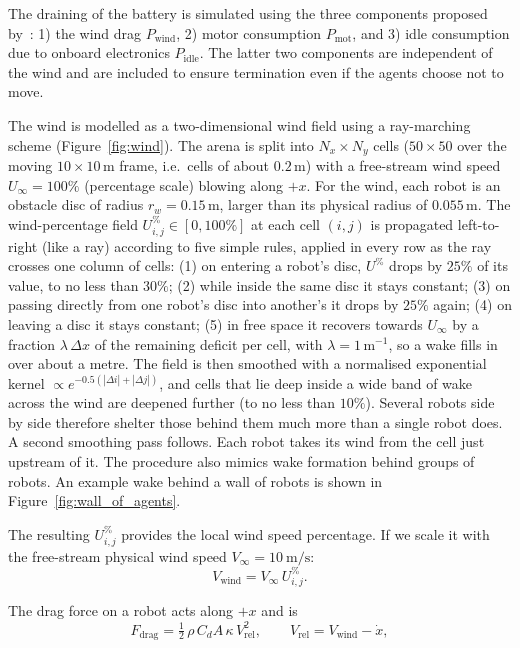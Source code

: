\documentclass[runningheads]{llncs}
\begin{document}
The draining of the battery is simulated using the three components proposed by~\cite{mahdavi2026energy}: 1) the wind drag $P_\text{wind}$, 2) motor consumption $P_\text{mot}$, and 3) idle consumption due to onboard electronics $P_\text{idle}$. The latter two components are independent of the wind and are included to ensure termination even if the agents choose not to move. 

The wind is modelled as a two-dimensional wind field using a ray-marching scheme (Figure~\ref{fig:wind}). The arena is split into $N_x \times N_y$ cells ($50 \times 50$ over the moving $10 \times 10$\,m frame, i.e.\ cells of about $0.2$\,m) with a free-stream wind speed $U_\infty=100\%$ (percentage scale) blowing along $+x$. For the wind, each robot is an obstacle disc of radius $r_w = 0.15$\,m, larger than its physical radius of $0.055$\,m. The wind-percentage field $U^\%_{i,j}\in[0,100\%]$ at each cell $(i,j)$ is propagated left-to-right (like a ray) according to five simple rules, applied in every row as the ray crosses one column of cells: (1) on entering a robot's disc, $U^\%$ drops by $25\%$ of its value, to no less than $30\%$; (2) while inside the same disc it stays constant; (3) on passing directly from one robot's disc into another's it drops by $25\%$ again; (4) on leaving a disc it stays constant; (5) in free space it recovers towards $U_\infty$ by a fraction $\lambda\,\Delta x$ of the remaining deficit per cell, with $\lambda = 1\,\text{m}^{-1}$, so a wake fills in over about a metre. The field is then smoothed with a normalised exponential kernel $\propto e^{-0.5(|\Delta i| + |\Delta j|)}$, and cells that lie deep inside a wide band of wake across the wind are deepened further (to no less than $10\%$). Several robots side by side therefore shelter those behind them much more than a single robot does. A second smoothing pass follows. Each robot takes its wind from the cell just upstream of it. The procedure also mimics wake formation behind groups of robots. An example wake behind a wall of robots is shown in Figure~\ref{fig:wall_of_agents}.

The resulting $U^\%_{i,j}$ provides the local wind speed percentage. If we scale it with the free-stream physical wind speed $V_\infty = 10~\text{m/s}$:
\begin{equation}
V_{\text{wind}} = V_\infty\,U^\%_{i,j}.
\label{eq:vwind_compact}
\end{equation}

The drag force on a robot acts along $+x$ and is
\begin{equation}
F_{\text{drag}} = \tfrac{1}{2}\,\rho\,C_dA\,\kappa\,V_{\text{rel}}^{2}, \qquad V_{\text{rel}} = V_{\text{wind}} - \dot{x},
\label{eq:fdrag_compact}
\end{equation}
\end{document}
